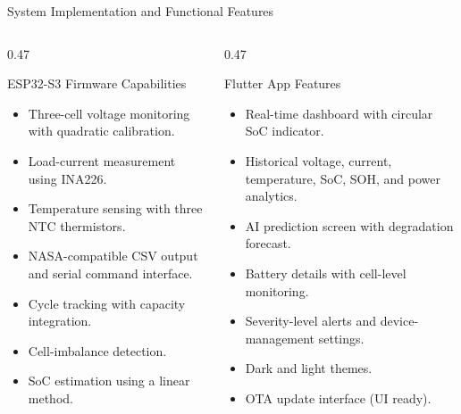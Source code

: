\documentclass[10pt,aspectratio=43]{beamer}
\begin{document}
\begin{frame}{System Implementation and Functional Features}
  \footnotesize
  \begin{columns}[T,onlytextwidth]
    \begin{column}{0.47\textwidth}
      \begin{block}{ESP32-S3 Firmware Capabilities}
        \begin{itemize}
          \setlength{\itemsep}{3pt}
          \item Three-cell voltage monitoring with quadratic calibration.
          \item Load-current measurement using INA226.
          \item Temperature sensing with three NTC thermistors.
          \item NASA-compatible CSV output and serial command interface.
          \item Cycle tracking with capacity integration.
          \item Cell-imbalance detection.
          \item SoC estimation using a linear method.
        \end{itemize}
      \end{block}
    \end{column}
    \begin{column}{0.47\textwidth}
      \begin{block}{Flutter App Features}
        \begin{itemize}
          \setlength{\itemsep}{3pt}
          \item Real-time dashboard with circular SoC indicator.
          \item Historical voltage, current, temperature, SoC, SOH, and power analytics.
          \item AI prediction screen with degradation forecast.
          \item Battery details with cell-level monitoring.
          \item Severity-level alerts and device-management settings.
          \item Dark and light themes.
          \item OTA update interface (UI ready).
        \end{itemize}
      \end{block}
    \end{column}
  \end{columns}
\end{frame}
\end{document}
